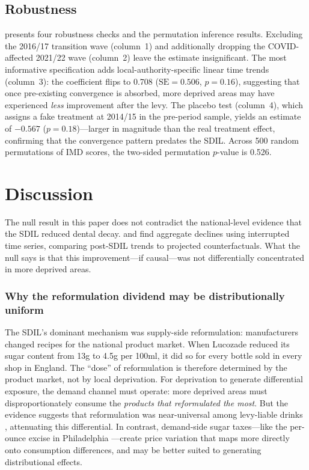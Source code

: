 \documentclass[12pt]{article}
\begin{document}
\subsection{Robustness}

 presents four robustness checks and the permutation inference results. Excluding the 2016/17 transition wave (column~1) and additionally dropping the COVID-affected 2021/22 wave (column~2) leave the estimate insignificant. The most informative specification adds local-authority-specific linear time trends (column~3): the coefficient flips to 0.708 ($\text{SE} = 0.506$, $p = 0.16$), suggesting that once pre-existing convergence is absorbed, more deprived areas may have experienced \textit{less} improvement after the levy. The placebo test (column~4), which assigns a fake treatment at 2014/15 in the pre-period sample, yields an estimate of $-0.567$ ($p = 0.18$)---larger in magnitude than the real treatment effect, confirming that the convergence pattern predates the SDIL. Across 500 random permutations of IMD scores, the two-sided permutation $p$-value is 0.526.




\section{Discussion}

The null result in this paper does not contradict the national-level evidence that the SDIL reduced dental decay. \citet{rogers2024sdil} and \citet{sheringham2025sdil} find aggregate declines using interrupted time series, comparing post-SDIL trends to projected counterfactuals. What the null says is that this improvement---if causal---was not differentially concentrated in more deprived areas.

\subsubsection*{Why the reformulation dividend may be distributionally uniform} The SDIL's dominant mechanism was supply-side reformulation: manufacturers changed recipes for the national product market. When Lucozade reduced its sugar content from 13g to 4.5g per 100ml, it did so for every bottle sold in every shop in England. The ``dose'' of reformulation is therefore determined by the product market, not by local deprivation. For deprivation to generate differential exposure, the demand channel must operate: more deprived areas must disproportionately consume the \textit{products that reformulated the most}. But the evidence suggests that reformulation was near-universal among levy-liable drinks \citep{bandy2020reformulation}, attenuating this differential. In contrast, demand-side sugar taxes---like the per-ounce excise in Philadelphia \citep{cawley2021philadelphia}---create price variation that maps more directly onto consumption differences, and may be better suited to generating distributional effects.
\end{document}
